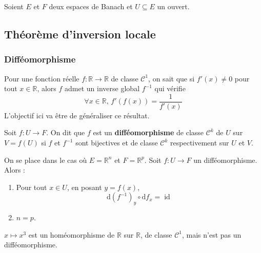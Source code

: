 




	Soient $E$ et $F$ deux espaces de Banach et $U \subseteq E$ un ouvert.

	\subsection{Théorème d'inversion locale}

	\subsubsection{Difféomorphisme}


	Pour une fonction réelle $f : \mathbb{R} \rightarrow \mathbb{R}$ de classe $\mathcal{C}^1$, on sait que si $f'(x) \neq 0$ pour tout $x \in \mathbb{R}$, alors $f$ admet un inverse global $f^{-1}$ qui vérifie
	\[ \forall x \in \mathbb{R}, \, f'(f(x)) = \frac{1}{f'(x)} \]
	L'objectif ici va être de généraliser ce résultat.


	\begin{definition}
		Soit $f : U \rightarrow F$. On dit que $f$ est un \textbf{difféomorphisme} de classe $\mathcal{C}^k$ de $U$ sur $V = f(U)$ si $f$ et $f^{-1}$ sont bijectives et de classe $\mathcal{C}^k$ respectivement sur $U$ et $V$.
	\end{definition}

	\begin{proposition}
		On se place dans le cas où $E = \mathbb{R}^n$ et $F = \mathbb{R}^p$. Soit $f : U \rightarrow F$ un difféomorphisme. Alors :
		\begin{enumerate}[label=(\roman*)]
			\item Pour tout $x \in U$, en posant $y = f(x)$,
			\[ \mathrm{d}(f^{-1})_y \circ \mathrm{d}f_x = \operatorname{id} \]
			\item $n=p$.
		\end{enumerate}
	\end{proposition}

	\begin{example}
		$x \mapsto x^3$ est un homéomorphisme de $\mathbb{R}$ sur $\mathbb{R}$, de classe $\mathcal{C}^1$, mais n'est pas un difféomorphisme.
	\end{example}

